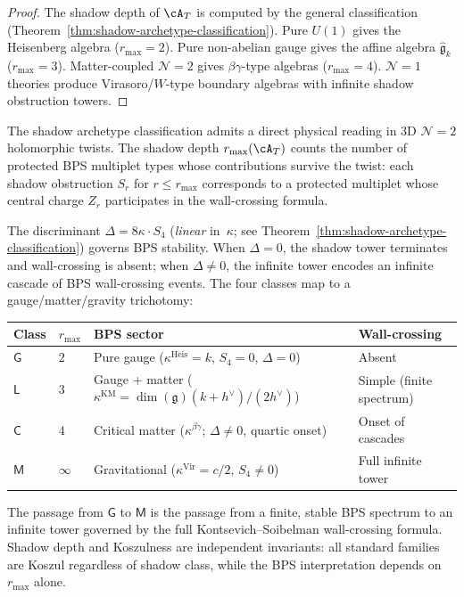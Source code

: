 \begin{proof}
The shadow depth of $\cA_T$ is computed by the general
classification
(Theorem~\ref{thm:shadow-archetype-classification}).
Pure $U(1)$ gives the Heisenberg algebra ($r_{\max}=2$).
Pure non-abelian gauge gives the affine algebra
$\widehat{\mathfrak{g}}_k$ ($r_{\max}=3$).
Matter-coupled $\mathcal{N}=2$ gives $\beta\gamma$-type
algebras ($r_{\max}=4$). $\mathcal{N}=1$ theories produce
Virasoro/$W$-type boundary algebras with infinite shadow obstruction towers.
\end{proof}


\begin{remark}
\label{rem:ht-shadow-bps-protected}
The shadow archetype classification admits a direct
physical reading in 3D $\mathcal{N}=2$ holomorphic twists.
The shadow depth $r_{\max}(\cA_T)$ counts the number of
protected BPS multiplet types whose contributions survive
the twist: each shadow obstruction $S_r$ for
$r \leq r_{\max}$ corresponds to a protected multiplet
whose central charge $Z_r$ participates in the wall-crossing
formula.

The discriminant $\Delta = 8\kappa \cdot S_4$
(\emph{linear} in~$\kappa$; see
Theorem~\ref{thm:shadow-archetype-classification})
governs BPS stability. When $\Delta = 0$, the shadow
tower terminates and wall-crossing is absent; when
$\Delta \neq 0$, the infinite tower encodes an infinite
cascade of BPS wall-crossing events. The four classes
map to a gauge/matter/gravity trichotomy:
\begin{center}
\renewcommand{\arraystretch}{1.2}
\begin{tabular}{@{}llll@{}}
\toprule
\textbf{Class} & $r_{\max}$ & \textbf{BPS sector} & \textbf{Wall-crossing} \\
\midrule
$\mathsf{G}$ & $2$ & Pure gauge ($\kappa^{\mathrm{Heis}} = k$,
 $S_4 = 0$, $\Delta = 0$) & Absent \\
$\mathsf{L}$ & $3$ & Gauge + matter ($\kappa^{\mathrm{KM}} = \dim(\mathfrak{g})(k+h^{\vee})/(2h^{\vee})$)
 & Simple (finite spectrum) \\
$\mathsf{C}$ & $4$ & Critical matter ($\kappa^{\beta\gamma}$;
 $\Delta \neq 0$, quartic onset) & Onset of cascades \\
$\mathsf{M}$ & $\infty$ & Gravitational ($\kappa^{\mathrm{Vir}} = c/2$,
 $S_4 \neq 0$) & Full infinite tower \\
\bottomrule
\end{tabular}
\end{center}
The passage from $\mathsf{G}$ to $\mathsf{M}$ is the
passage from a finite, stable BPS spectrum to an infinite
tower governed by the full Kontsevich--Soibelman
wall-crossing formula.
Shadow depth and Koszulness are independent invariants:
all standard families are Koszul regardless of shadow class,
while the BPS interpretation depends on~$r_{\max}$ alone.
\end{remark}

